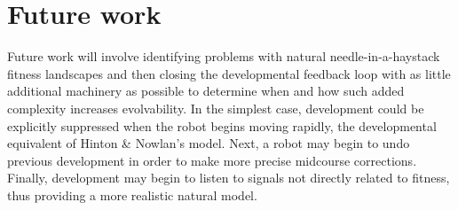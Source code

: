 ﻿\section{Future work}


Future work will involve identifying problems with natural needle-in-a-haystack fitness landscapes and then closing the developmental feedback loop with as little additional machinery as possible to determine when and how such added complexity increases evolvability. In the simplest case, 
development could be explicitly suppressed when the robot begins
moving rapidly, the developmental equivalent of Hinton \& Nowlan's model.
Next, a robot may begin to undo previous development in order to make more precise midcourse corrections. Finally, development may begin to listen to signals not directly related to fitness, thus providing a more realistic natural model.



